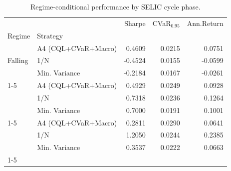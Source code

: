 \begin{table}
\caption{Regime-conditional performance by SELIC cycle phase.}
\label{tab:regime_conditional}
\begin{tabular}{llrrr}
\toprule
 &  & Sharpe & CVaR$_{0.95}$ & Ann.Return \\
Regime & Strategy &  &  &  \\
\midrule
\multirow[t]{3}{*}{Falling} & A4 (CQL+CVaR+Macro) & 0.4609 & 0.0215 & 0.0751 \\
 & 1/N & -0.4524 & 0.0155 & -0.0599 \\
 & Min. Variance & -0.2184 & 0.0167 & -0.0261 \\
\cline{1-5}
\multirow[t]{3}{*}{Stable} & A4 (CQL+CVaR+Macro) & 0.4929 & 0.0249 & 0.0928 \\
 & 1/N & 0.7318 & 0.0236 & 0.1264 \\
 & Min. Variance & 0.7000 & 0.0191 & 0.1001 \\
\cline{1-5}
\multirow[t]{3}{*}{Rising} & A4 (CQL+CVaR+Macro) & 0.2811 & 0.0290 & 0.0641 \\
 & 1/N & 1.2050 & 0.0244 & 0.2385 \\
 & Min. Variance & 0.3537 & 0.0222 & 0.0663 \\
\cline{1-5}
\bottomrule
\end{tabular}
\end{table}
